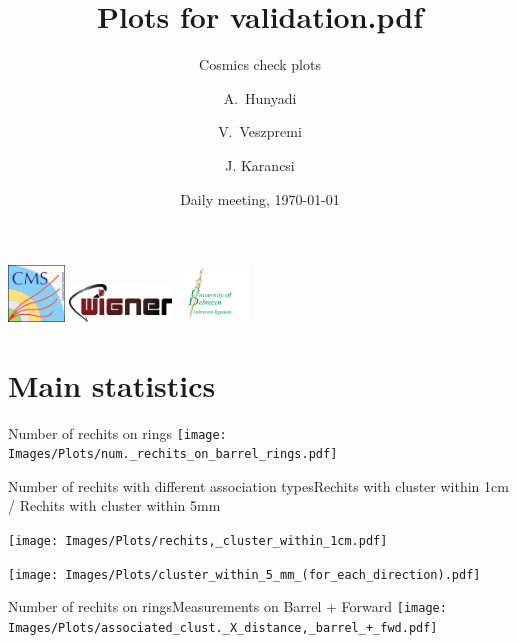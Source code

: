 \documentclass{beamer}
\title{Plots for validation.pdf}
\subtitle{Cosmics check plots}
\author{A.~Hunyadi\inst{1,2} \and V.~Veszpremi\inst{1} \and J. Karancsi\inst{2}}
\institute[] %
{
  \inst{1}%
  Wigner Research Centre for Physics, Budapest
  \and
  \inst{2}%
  University of Debrecen, Debrecen
}
\date{Daily meeting, \today}
\begin{document}
\begin{frame}
  \vspace*{-0.3cm}
  \titlepage
  \vspace*{-0.5cm}
  \begin{center}
  \includegraphics[height=1.5cm]{Images/cms_logo.png}\hspace*{0.3cm}
  \includegraphics[height=1.0cm]{Images/wigner_logo.png}\hspace*{0.4cm}
  \includegraphics[height=1.5cm]{Images/egyetem_logo.png}
  \end{center}
\end{frame}


\section{Main statistics}

\begin{frame}{Number of rechits on rings}{}
    \centering
    \texttt{[image: Images/Plots/num.\_rechits\_on\_barrel\_rings.pdf]}
\end{frame}

\begin{frame}{Number of rechits with different association types}{Rechits with cluster within 1cm / Rechits with cluster within 5mm}
  \begin{minipage}{0.49\textwidth}
    \centering
    \texttt{[image: Images/Plots/rechits,\_cluster\_within\_1cm.pdf]}
  \end{minipage}%
  \hspace{0.01\textwidth}%
  \begin{minipage}{0.49\textwidth}
    \centering
    \texttt{[image: Images/Plots/cluster\_within\_5\_mm\_(for\_each\_direction).pdf]}
  \end{minipage}
\end{frame}

\begin{frame}{Number of rechits on rings}{Measurements on Barrel + Forward}
    \centering
    \texttt{[image: Images/Plots/associated\_clust.\_X\_distance,\_barrel\_+\_fwd.pdf]}
\end{frame}
\end{document}
